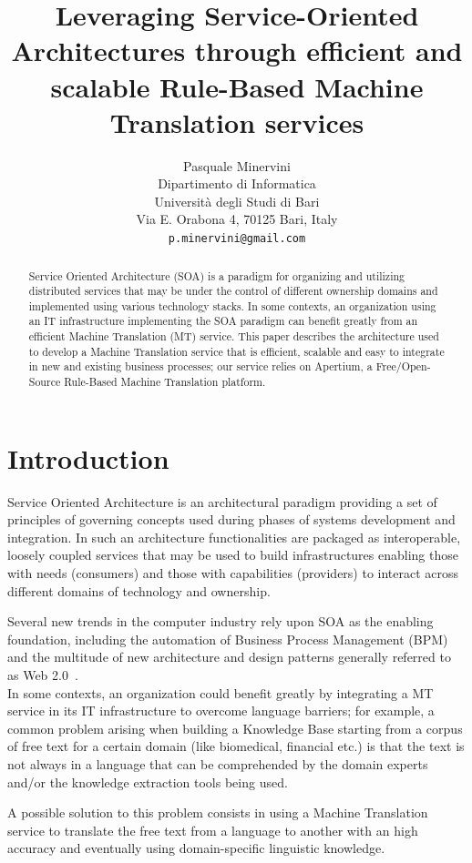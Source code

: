 \documentclass[11pt]{article}
\title{Leveraging Service-Oriented Architectures through efficient and scalable Rule-Based Machine Translation services}
\author{Pasquale Minervini\\
  Dipartimento di Informatica\\
  Università degli Studi di Bari\\
  Via E. Orabona 4, 70125 Bari, Italy\\
  {\tt p.minervini@gmail.com}}
\date{}
\begin{document}
\maketitle

\begin{abstract}
Service Oriented Architecture (SOA) is a paradigm for organizing and utilizing distributed services that may be under the 
control of different ownership domains and implemented using various technology stacks. In some contexts, an organization
using an IT infrastructure implementing the SOA paradigm can benefit greatly from an efficient Machine Translation (MT) service. 
This paper describes the architecture used to develop a Machine Translation service that is efficient, scalable and easy to 
integrate in new and existing business processes; our service relies on Apertium, a Free/Open-Source Rule-Based Machine Translation platform.
\end{abstract}


\section{Introduction}

Service Oriented Architecture is an architectural paradigm providing  a set of principles of governing concepts used during phases 
of systems development and integration. In such an architecture functionalities are packaged as interoperable, loosely coupled
services that may be used to build infrastructures enabling those with needs (consumers) and those with capabilities (providers) 
to interact across different domains of technology and ownership.

Several new trends in the computer industry rely upon SOA as the enabling foundation, including the automation of Business Process 
Management (BPM) and the multitude of new architecture and design patterns generally referred to as Web 2.0~\citep{web20}.\\

In some contexts, an organization could benefit greatly by integrating a MT service in its IT infrastructure to overcome 
language barriers; for example, a common problem arising when building a Knowledge Base starting from a corpus of free text for
a certain domain (like biomedical, financial etc.) is that the text is not always in a language that can be comprehended by the
domain experts and/or the knowledge extraction tools being used.

A possible solution to this problem consists in using a Machine Translation service to translate the free text from a language to another with 
an high accuracy and eventually using domain-specific linguistic knowledge.\\
\end{document}
